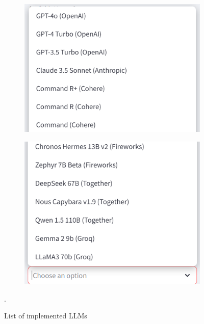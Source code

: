 \begin{figure}[H]
    \begin{subfigure}{\textwidth}
        \centering
        \includegraphics[width=.7\linewidth]{./figures/select-llms-p1.png}
    \end{subfigure}
    \begin{subfigure}{\textwidth}
        \centering
        \includegraphics[width=.7\linewidth]{./figures/select-llms-p2.png}
    \end{subfigure}
    \caption{List of implemented LLMs}.
\end{figure}
